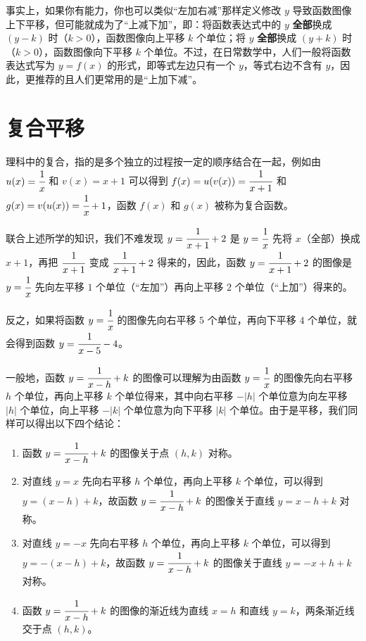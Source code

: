 \documentclass[a4paper]{article}
\begin{document}
事实上，如果你有能力，你也可以类似“左加右减”那样定义修改 $y$ 导致函数图像上下平移，但可能就成为了“上减下加”，即：将函数表达式中的 $y$ \textbf{全部}换成 $(y - k)$ 时（$k > 0$），函数图像向上平移 $k$ 个单位；将 $y$ \textbf{全部}换成 $(y + k)$ 时（$k > 0$），函数图像向下平移 $k$ 个单位。不过，在日常数学中，人们一般将函数表达式写为 $y = f(x)$ 的形式，即等式左边只有一个 $y$，等式右边不含有 $y$，因此，更推荐的且人们更常用的是“上加下减”。

\section{复合平移}

理科中的复合，指的是多个独立的过程按一定的顺序结合在一起，例如由 $u(x) = \cfrac{1}{x}$ 和 $v(x) = x + 1$ 可以得到 $f(x) = u(v(x)) = \cfrac{1}{x + 1}$ 和 $g(x) = v(u(x)) = \cfrac{1}{x} + 1$，函数 $f(x)$ 和 $g(x)$ 被称为复合函数。

联合上述所学的知识，我们不难发现 $y = \cfrac{1}{x + 1} + 2$ 是 $y = \cfrac{1}{x}$ 先将 $x$（全部）换成 $x + 1$，再把 $\cfrac{1}{x + 1}$ 变成 $\cfrac{1}{x + 1} + 2$ 得来的，因此，函数 $y = \cfrac{1}{x + 1} + 2$ 的图像是 $y = \cfrac{1}{x}$ 先向左平移 $1$ 个单位（“左加”）再向上平移 $2$ 个单位（“上加”）得来的。

反之，如果将函数 $y = \cfrac{1}{x}$ 的图像先向右平移 $5$ 个单位，再向下平移 $4$ 个单位，就会得到函数 $y = \cfrac{1}{x - 5} - 4$。

一般地，函数 $y = \cfrac{1}{x - h} + k$ 的图像可以理解为由函数 $y = \cfrac{1}{x}$ 的图像先向右平移 $h$ 个单位，再向上平移 $k$ 个单位得来，其中向右平移 $-|h|$ 个单位意为向左平移 $|h|$ 个单位，向上平移 $-|k|$ 个单位意为向下平移 $|k|$ 个单位。由于是平移，我们同样可以得出以下四个结论：

\begin{enumerate}[（1）]
	\item 函数 $y = \cfrac{1}{x - h} + k$ 的图像关于点 $(h, k)$ 对称。
	\item 对直线 $y = x$ 先向右平移 $h$ 个单位，再向上平移 $k$ 个单位，可以得到 $y = (x - h) + k$，故函数 $y = \cfrac{1}{x - h} + k$ 的图像关于直线 $y = x - h + k$ 对称。
	\item 对直线 $y = -x$ 先向右平移 $h$ 个单位，再向上平移 $k$ 个单位，可以得到 $y = -(x - h) + k$，故函数 $y = \cfrac{1}{x - h} + k$ 的图像关于直线 $y = -x + h + k$ 对称。
	\item 函数 $y = \cfrac{1}{x - h} + k$ 的图像的渐近线为直线 $x = h$ 和直线 $y = k$，两条渐近线交于点 $(h, k)$。
\end{enumerate}
\end{document}
